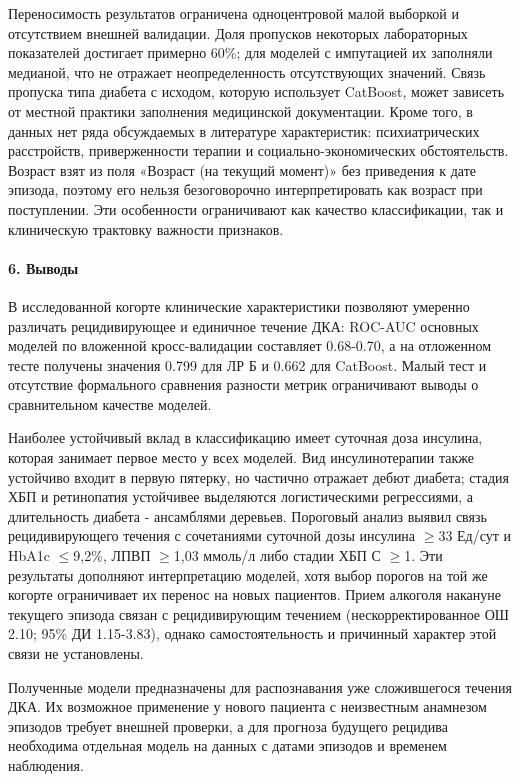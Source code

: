 \documentclass{crm-article}
\begin{document}
Переносимость результатов ограничена одноцентровой малой выборкой и отсутствием внешней валидации. Доля пропусков некоторых лабораторных показателей достигает примерно 60\%; для моделей с импутацией их заполняли медианой, что не отражает неопределенность отсутствующих значений. Связь пропуска типа диабета с исходом, которую использует CatBoost, может зависеть от местной практики заполнения медицинской документации. Кроме того, в данных нет ряда обсуждаемых в литературе характеристик: психиатрических расстройств, приверженности терапии и социально-экономических обстоятельств. Возраст взят из поля «Возраст (на текущий момент)» без приведения к дате эпизода, поэтому его нельзя безоговорочно интерпретировать как возраст при поступлении. Эти особенности ограничивают как качество классификации, так и клиническую трактовку важности признаков.

\paragraph{6. Выводы}\label{sec6}

В исследованной когорте клинические характеристики позволяют умеренно различать рецидивирующее и единичное течение ДКА: ROC-AUC основных моделей по вложенной кросс-валидации составляет 0.68-0.70, а на отложенном тесте получены значения 0.799 для ЛР Б и 0.662 для CatBoost. Малый тест и отсутствие формального сравнения разности метрик ограничивают выводы о сравнительном качестве моделей.

Наиболее устойчивый вклад в классификацию имеет суточная доза инсулина, которая занимает первое место у всех моделей. Вид инсулинотерапии также устойчиво входит в первую пятерку, но частично отражает дебют диабета; стадия ХБП и ретинопатия устойчивее выделяются логистическими регрессиями, а длительность диабета - ансамблями деревьев. Пороговый анализ выявил связь рецидивирующего течения с сочетаниями суточной дозы инсулина $\geq$33 Ед/сут и HbA1c $\leq$9,2\%, ЛПВП $\geq$1,03 ммоль/л либо стадии ХБП С $\geq$1. Эти результаты дополняют интерпретацию моделей, хотя выбор порогов на той же когорте ограничивает их перенос на новых пациентов. Прием алкоголя накануне текущего эпизода связан с рецидивирующим течением (нескорректированное ОШ 2.10; 95\% ДИ 1.15-3.83), однако самостоятельность и причинный характер этой связи не установлены.

Полученные модели предназначены для распознавания уже сложившегося течения ДКА. Их возможное применение у нового пациента с неизвестным анамнезом эпизодов требует внешней проверки, а для прогноза будущего рецидива необходима отдельная модель на данных с датами эпизодов и временем наблюдения.
\end{document}
